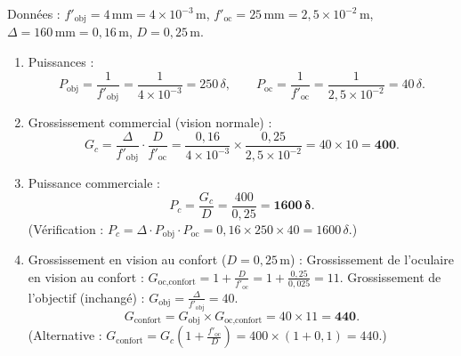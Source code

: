 \documentclass[11pt]{article}
\begin{document}
\begin{corrige}
Données : $f'_{\text{obj}} = 4\,\text{mm} = 4\times10^{-3}\,\text{m}$, $f'_{\text{oc}} = 25\,\text{mm} = 2,5\times10^{-2}\,\text{m}$, $\Delta = 160\,\text{mm} = 0,16\,\text{m}$, $D = 0,25\,\text{m}$.

\begin{enumerate}
    \item Puissances :
    \[
    P_{\text{obj}} = \frac{1}{f'_{\text{obj}}} = \frac{1}{4\times10^{-3}} = 250\,\delta, \qquad
    P_{\text{oc}} = \frac{1}{f'_{\text{oc}}} = \frac{1}{2,5\times10^{-2}} = 40\,\delta.
    \]
    \item Grossissement commercial (vision normale) :
    \[
    G_c = \frac{\Delta}{f'_{\text{obj}}} \cdot \frac{D}{f'_{\text{oc}}} = \frac{0,16}{4\times10^{-3}} \times \frac{0,25}{2,5\times10^{-2}} = 40 \times 10 = \mathbf{400}.
    \]
    \item Puissance commerciale :
    \[
    P_c = \frac{G_c}{D} = \frac{400}{0,25} = \mathbf{1600\,\delta}.
    \]
    (Vérification : $P_c = \Delta \cdot P_{\text{obj}} \cdot P_{\text{oc}} = 0,16 \times 250 \times 40 = 1600\,\delta$.)
    \item Grossissement en vision au confort ($D=0,25\,\text{m}$) :
    Grossissement de l'oculaire en vision au confort : $G_{\text{oc,confort}} = 1 + \frac{D}{f'_{\text{oc}}} = 1 + \frac{0,25}{0,025} = 11$.
    Grossissement de l'objectif (inchangé) : $G_{\text{obj}} = \frac{\Delta}{f'_{\text{obj}}} = 40$.
    \[
    G_{\text{confort}} = G_{\text{obj}} \times G_{\text{oc,confort}} = 40 \times 11 = \mathbf{440}.
    \]
    (Alternative : $G_{\text{confort}} = G_c \left(1 + \frac{f'_{\text{oc}}}{D}\right) = 400 \times (1 + 0,1) = 440$.)
\end{enumerate}
\end{corrige}
\end{document}
